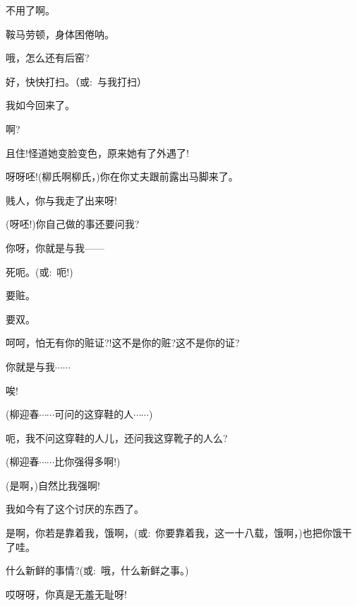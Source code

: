 {{不用了啊。

鞍马劳顿，身体困倦呐。

哦，怎么还有后窑?

好，快快打扫。（{\akai 或}:~与我打扫）

我如今回来了。

啊?







且住!怪道她变脸变色，原来她有了外遇了!

呀呀呸!(柳氏啊柳氏，)你在你丈夫跟前露出马脚来了。

贱人，你与我走了出来呀!

(呀呸!)你自己做的事还要问我?

你呀，你就是与我------

死呃。({\akai 或}:~呃!)

要赃。

要双。

呵呵，怕无有你的赃证?!这不是你的赃?这不是你的证?

你就是与我$\cdots{}\cdots{}$

唉!

(柳迎春\hspace{20pt}$\cdots{}\cdots{}$可问的这穿鞋的人$\cdots{}\cdots{}$)

呃，我不问这穿鞋的人儿，还问我这穿靴子的人么?

(柳迎春\hspace{20pt}$\cdots{}\cdots{}$比你强得多啊!)

(是啊，)自然比我强啊!

我如今有了这个讨厌的东西了。

是啊，你若是靠着我，饿啊，({\akai 或}:~你要靠着我，这一十八载，饿啊，)也把你饿干了哇。

什么新鲜的事情?({\akai 或}:~哦，什么新鲜之事。)

哎呀呀，你真是无羞无耻呀!

}}
